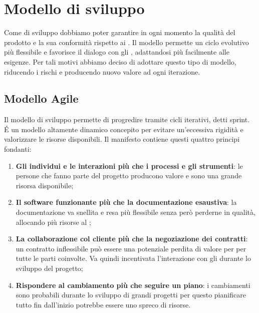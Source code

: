 \section{Modello di sviluppo}
Come  di sviluppo dobbiamo poter garantire in ogni momento la qualità del prodotto  e la sua conformità rispetto ai . \newline
Il modello  permette un ciclo evolutivo più flessibile e favorisce il dialogo con gli , adattandosi più facilmente alle esigenze. \newline 
Per tali motivi abbiamo deciso di adottare questo tipo di modello, riducendo i rischi e producendo nuovo valore ad ogni iterazione.

\subsection{Modello Agile}
Il modello di sviluppo  permette di progredire tramite cicli iterativi, detti sprint.
É un modello altamente dinamico concepito per evitare un'eccessiva rigidità e valorizzare le risorse disponibili. \newline
Il manifesto  contiene questi quattro principi fondanti:

\begin{enumerate}
    \item \textbf{Gli individui e le interazioni più che i processi e gli strumenti}: le persone che fanno parte del progetto producono valore e sono una grande risorsa disponibile;
    \item \textbf{Il software funzionante più che la documentazione esaustiva}: la documentazione va snellita e resa più flessibile senza però perderne in qualità, allocando più risorse al ;
    \item \textbf{La collaborazione col cliente più che la negoziazione dei contratti}: un contratto inflessibile può essere una potenziale perdita di valore per per tutte le parti coinvolte. Va quindi incentivata l’interazione con gli  durante lo sviluppo del progetto;
    \item \textbf{Rispondere al cambiamento più che seguire un piano}: i cambiamenti sono probabili durante lo sviluppo di grandi progetti per questo pianificare tutto fin dall'inizio potrebbe essere uno spreco di risorse.
\end{enumerate}

